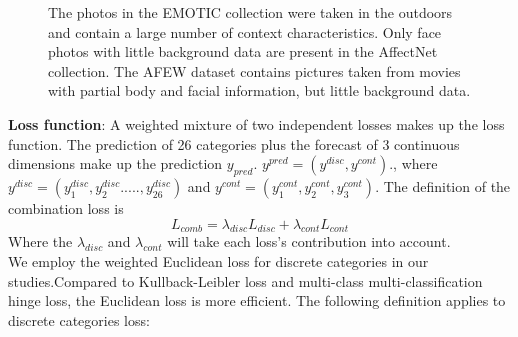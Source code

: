 \documentclass[conference]{IEEEtran}
\begin{document}
\begin{figure*}[!h]
\centering
{}%
%
%
\centering
\caption{The photos in the EMOTIC collection were taken in the outdoors and contain a large number of context characteristics. Only face photos with little background data are present in the AffectNet \cite{ref-34} collection. The AFEW dataset \cite{ref-32} contains pictures taken from movies with partial body and facial information, but little background data.}
 \label{emotic-dataset}
\end{figure*}

\textbf{Loss function}:
A weighted mixture of two independent losses makes up the loss function. The prediction of 26 categories plus the forecast of 3 continuous dimensions make up the prediction $y_{pred}$. $y^{pred} = (y^{disc}, y^{cont})$., where $y^{disc} =(y_{1}^{disc}, y_{2}^{disc}.....,y_{26}^{disc}) $ and $y^{cont} =(y_{1}^{cont}, y_{2}^{cont}, y_{3}^{cont}) $. The definition of the combination loss is \\
\begin{equation}
L_{comb} = \lambda_{disc} L_{disc}+ \lambda_{cont}L_{cont}
\label{L-combination}
\end{equation}
Where the $ \lambda_{disc} $ and $ \lambda_{cont} $ will take each loss's contribution into account.\\
We employ the weighted Euclidean loss for discrete categories in our studies.Compared to Kullback-Leibler loss and multi-class multi-classification hinge loss, the Euclidean loss is more efficient. The following definition applies to discrete categories loss:
\end{document}
